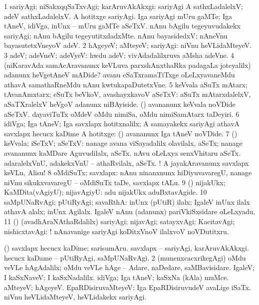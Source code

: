 \bentry
{}
\gl{\kirxvi}
\bmng
\bnum
\num{1} sariyAgi; niSakxqqSaTxvAgi; karAruvAkAkxgi:  sariyAgi A sathxLadalelxV; adeV sathxLadalelxV.  A hotitxge sariyAgi.  Iga sariyAgi mUru gaMTe; Iga tAneV, idiVga, inUnx -- mUru gaMTe aSeTxV.  nAnu bAgilu tegeyuvudakekx sariyAgi; nAnu bAgilu tegeyutitxdadxMte.  nAnu bayasidedxV; nAneVnu bayasutetxVneyoV adeV. 
\num{2} hAgeyeV; aMteyeV; sariyAgi:  niVnu heVLidaMteyeV. 
\num{3} adeV; adeVneV; adeVyeV:  hwdu adeV; vivAdadalilxruva aMsha adeVne. 
\num{4} (niKaravAda samAcAravanunx keVLuva parxshAnxthaRka padagaLa joteyalilx)  adanunx heVgetAneV mADide?  avanu eSaTxramaTiTxge oLeLxyavaneMdu athavA samathaRneMdu nAnu kwtukapaDutetxVne. 
\num{5} keVvala aSuTx mAtarx; tAvanAmxtarx; eSuTx beVkoV, avashayxkavoV aSeTxV:  aSuTx mAtarxdalelxV, aSaTXralelxV heVgoV adanunx niBAyiside.  (\birx) avananunx keVvala noVDide aSeTxV.  dayaviTuTx oMdeV oMdu nimiSa, oMdu nimiSamAtarx taDeyiri. 
\num{6} idiVga; Iga tAneV; Iga savxlapx hotitxnalilx; A samayakekx sariyAgi athavA savxlapx hecucx kaDime A hotitxge:  (\birx) avananunx Iga tAneV noVDide. 
\num{7} (\AmA) keVvala; iSeTxV; aSeTxV:  nanage avana viSayadalilx olavilalx, aSeTx; nanage avananunx kaMDare Aguvudilalx, aSeTx.  nAvu oLeLxya senxVhitaru aSeTx.  adaralelxVnU, adakekxVnU -- athaRvilalx, aSeTx. ! A jayakAravanunx savxlapx keVLu, Alisu! 
\num{8} oMdiSuTx; savxlapx:  nAnu ninanxnunx hiDiyuvavaregU, nanage niVnu sikukxvavaregU -- oMdiSuTx taDe, savxlapx tALu. 
\num{9} (\AmA) nijakUkx; KaMDita(vAgiyU); nijavAgiyU:  adu nijakUkx aduBxtavAgide. 
\num{10} saMpUNaRvAgi; pUtiRyAgi; savaRthA:  inUnx (pUtiR) ilalx; IgaleV inUnx ilalx athavA alalx; inUnx Agilalx.  IgaleV nAnu (adanunx) pariVkiSxsidare oLeLxyadu. 
\num{11} (\ashi) (avadhAraNAthaRdalilx) sariyAgi; nijavAgi; satayxvAgi; KacitavAgi; nishicxtavAgi: ! nAnavanige sariyAgi koDitxVnoV ilalxvoV noVDutitxru. 
\enum
\emng

\noindent
\gl{\pagu}
\bmng
\bnum
{}  (\AmA) 
\banum
{} savxlapx hecucx kaDime; sarisumAru. 
 savxlapx -- sariyAgi, karAruvAkAkxgi. 
 hecucx kaDame -- pUtiRyAgi, saMpUNaRvAgi. 
\eanum
\numie
\num{2}  (munenxcacxrikegAgi) oMdu veVLe hAgAdalilx; oMdu veVLe hAge -- Adare, naDedare, saMBavisidare. 
  
\banum
{} IgaleV; I kaSxNaveV; I kaSxNadalilx. 
 idiVga; Iga tAneV; kaSxNa (kAla) muMce. 
\eanum
\numie
{}  
\banum
{} aMteyeV; hAgeyeV. 
 EpaRDisiruvaMteyeV:  Iga EpaRDisiruvudeV avaLige iSaTx. 
 niVnu heVLidaMteyeV, heVLidakekx sariyAgi. 
\eanum
\numie
\enum
\emng
\eentry

